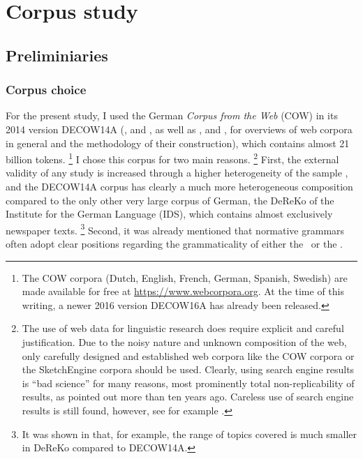 \section{Corpus study}
\label{sec:corpusstudies}

\subsection{Preliminiaries}

\subsubsection{Corpus choice}
\label{sec:gettingdata}

For the present study, I used the German \textit{Corpus from the Web} (COW) in its 2014 version DECOW14A (\citealp{SchaeferBildhauer2012full}, and \citealp{Schaefer2015b}, as well as \citealp{BiemannEa2013}, and \citealp{SchaeferBildhauer2013}, for overviews of web corpora in general and the methodology of their construction), which contains almost 21 billion tokens.%
\footnote{The COW corpora (Dutch, English, French, German, Spanish, Swedish) are made available for free at \url{https://www.webcorpora.org}.
At the time of this writing, a newer 2016 version DECOW16A has already been released.}
I chose this corpus for two main reasons.%
\footnote{The use of web data for linguistic research does require explicit and careful justification.
Due to the noisy nature and unknown composition of the web, only carefully designed and established web corpora like the COW corpora or the SketchEngine corpora \citep{KilgarriffEa2014} should be used.
Clearly, using search engine results is ``bad science'' for many reasons, most prominently total non-replicability of results, as \cite{Kilgarriff2006} pointed out more than ten years ago.
Careless use of search engine results is still found, however, see for example \citet[171--175]{DeclerckBrems2016}.}
First, the external validity of any study is increased through a higher heterogeneity of the sample \citep[30]{MaxwellDelaney2004}, and the DECOW14A corpus has clearly a much more heterogeneous composition compared to the only other very large corpus of German, the DeReKo \citep{KupietzEa2010} of the Institute for the German Language (IDS), which contains almost exclusively newspaper texts.%
\footnote{It was shown in \cite{W16-2601} that, for example, the range of topics covered is much smaller in DeReKo compared to DECOW14A.}
Second, it was already mentioned that normative grammars often adopt clear positions regarding the grammaticality of either the \NACa\ or the \PGCa.
